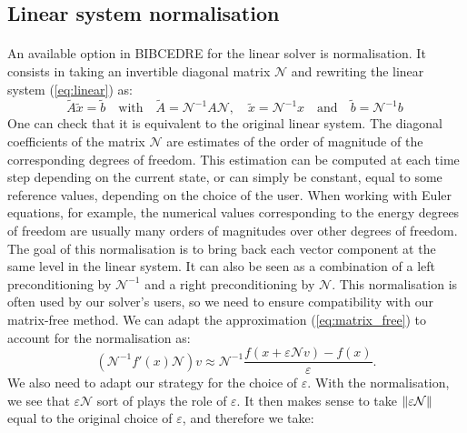     \pagebreak
    \subsection{Linear system normalisation}

      \paragraph{}
      An available option in BIBCEDRE for the linear solver is normalisation.
      It consists in taking an invertible diagonal matrix $\mathcal{N}$ and rewriting the linear system (\ref{eq:linear}) as:
      \begin{equation}
        \tilde{A}\tilde{x} = \tilde{b}
        \quad\textrm{with}\quad \tilde{A} = \mathcal{N}^{-1} A \mathcal{N},
        \quad \tilde{x} = \mathcal{N}^{-1} x
        \quad\textrm{and}\quad \tilde{b} = \mathcal{N}^{-1} b \
      \end{equation}
      One can check that it is equivalent to the original linear system.
      The diagonal coefficients of the matrix $\mathcal{N}$ are estimates of the order of magnitude of the corresponding degrees of freedom.
      This estimation can be computed at each time step depending on the current state, or can simply be constant, equal to some reference values, depending on the choice of the user.
      When working with Euler equations, for example, the numerical values corresponding to the energy degrees of freedom are usually many orders of magnitudes over other degrees of freedom.
      The goal of this normalisation is to bring back each vector component at the same level in the linear system.
      It can also be seen as a combination of a left preconditioning by $\mathcal{N}^{-1}$ and a right preconditioning by $\mathcal{N}$.
      This normalisation is often used by our solver's users, so we need to ensure compatibility with our matrix-free method.
      We can adapt the approximation (\ref{eq:matrix_free}) to account for the normalisation as:
      \begin{equation}
        \left( \mathcal{N}^{-1} f'\left(x\right) \mathcal{N} \right) v \approx \mathcal{N}^{-1} \frac{f\left(x + \varepsilon \mathcal{N} v\right) - f\left(x\right)}{\varepsilon} .
      \end{equation}
      We also need to adapt our strategy for the choice of $\varepsilon$.
      With the normalisation, we see that $\varepsilon \mathcal{N}$ sort of plays the role of $\varepsilon$.
      It then makes sense to take $\norm{\varepsilon \mathcal{N}}$ equal to the original choice of $\varepsilon$, and therefore we take:
